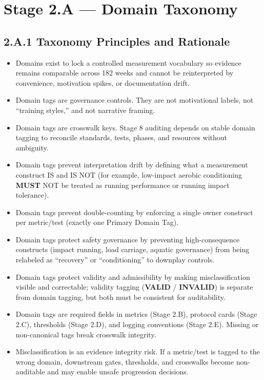 \documentclass[10pt]{article}
\begin{document}
\section*{Stage 2.A — Domain Taxonomy}
{}

\subsection*{2.A.1 Taxonomy Principles and Rationale}
{}

\begin{itemize}
\item Domains exist to lock a controlled measurement vocabulary so evidence remains comparable across 182 weeks and cannot be reinterpreted by convenience, motivation spikes, or documentation drift.
\item Domain tags are governance controls. They are not motivational labels, not “training styles,” and not narrative framing.
\item Domain tags are crosswalk keys. Stage 8 auditing depends on stable domain tagging to reconcile standards, tests, phases, and resources without ambiguity.
\item Domain tags prevent interpretation drift by defining what a measurement construct IS and IS NOT (for example, low-impact aerobic conditioning \textbf{MUST} NOT be treated as running performance or running impact tolerance).
\item Domain tags prevent double-counting by enforcing a single owner construct per metric/test (exactly one Primary Domain Tag).
\item Domain tags protect safety governance by preventing high-consequence constructs (impact running, load carriage, aquatic governance) from being relabeled as “recovery” or “conditioning” to downplay controls.
\item Domain tags protect validity and admissibility by making misclassification visible and correctable; validity tagging (\textbf{VALID} / \textbf{INVALID}) is separate from domain tagging, but both must be consistent for auditability.
\item Domain tags are required fields in metrics (Stage 2.B), protocol cards (Stage 2.C), thresholds (Stage 2.D), and logging conventions (Stage 2.E). Missing or non-canonical tags break crosswalk integrity.
\item Misclassification is an evidence integrity risk. If a metric/test is tagged to the wrong domain, downstream gates, thresholds, and crosswalks become non-auditable and may enable unsafe progression decisions.
\end{itemize}
\end{document}
